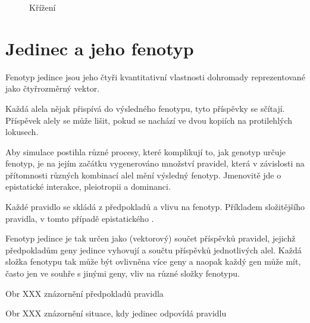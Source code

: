 \begin{figure}

  \caption{Křížení}
\end{figure}



\section{Jedinec a jeho fenotyp}

Fenotyp jedince jsou jeho čtyři kvantitativní vlastnosti dohromady reprezentované jako čtyřrozměrný vektor.

Každá alela nějak přispívá do výsledného fenotypu, tyto příspěvky se sčítají. Příspěvek alely se může lišit, pokud se
nachází ve dvou kopiích na protilehlých lokusech.

Aby simulace postihla různé procesy, které komplikují to, jak genotyp určuje fenotyp, je na jejím začátku
vygenerováno množství pravidel, která v závislosti na přítomnosti různých kombinací alel mění výsledný fenotyp.
Jmenovitě jde o epistatické interakce, pleiotropii a dominanci.

Každé pravidlo se skládá z předpokladů a vlivu na fenotyp. Příkladem složitějšího pravidla, v tomto případě
epistatického  .

Fenotyp jedince je tak určen jako (vektorový) součet příspěvků pravidel,
jejichž předpokladům geny jedince vyhovují a součtu příspěvků jednotlivých alel.
Každá složka fenotypu tak může být ovlivněna více geny a naopak každý gen může mít, často jen ve souhře s jinými geny,
vliv na různé složky fenotypu.

Obr XXX znázornění předpokladů pravidla

Obr XXX znázornění situace, kdy jedinec odpovídá pravidlu

